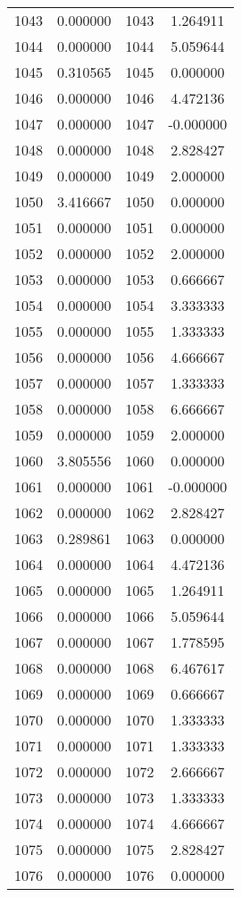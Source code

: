 \documentclass[12pt]{article}
\begin{document}
\begin{longtable}{@{}cccc@{}}
1043 & 0.000000 & 1043 & 1.264911 \\
1044 & 0.000000 & 1044 & 5.059644 \\
1045 & 0.310565 & 1045 & 0.000000 \\
1046 & 0.000000 & 1046 & 4.472136 \\
1047 & 0.000000 & 1047 & -0.000000 \\
1048 & 0.000000 & 1048 & 2.828427 \\
1049 & 0.000000 & 1049 & 2.000000 \\
1050 & 3.416667 & 1050 & 0.000000 \\
1051 & 0.000000 & 1051 & 0.000000 \\
1052 & 0.000000 & 1052 & 2.000000 \\
1053 & 0.000000 & 1053 & 0.666667 \\
1054 & 0.000000 & 1054 & 3.333333 \\
1055 & 0.000000 & 1055 & 1.333333 \\
1056 & 0.000000 & 1056 & 4.666667 \\
1057 & 0.000000 & 1057 & 1.333333 \\
1058 & 0.000000 & 1058 & 6.666667 \\
1059 & 0.000000 & 1059 & 2.000000 \\
1060 & 3.805556 & 1060 & 0.000000 \\
1061 & 0.000000 & 1061 & -0.000000 \\
1062 & 0.000000 & 1062 & 2.828427 \\
1063 & 0.289861 & 1063 & 0.000000 \\
1064 & 0.000000 & 1064 & 4.472136 \\
1065 & 0.000000 & 1065 & 1.264911 \\
1066 & 0.000000 & 1066 & 5.059644 \\
1067 & 0.000000 & 1067 & 1.778595 \\
1068 & 0.000000 & 1068 & 6.467617 \\
1069 & 0.000000 & 1069 & 0.666667 \\
1070 & 0.000000 & 1070 & 1.333333 \\
1071 & 0.000000 & 1071 & 1.333333 \\
1072 & 0.000000 & 1072 & 2.666667 \\
1073 & 0.000000 & 1073 & 1.333333 \\
1074 & 0.000000 & 1074 & 4.666667 \\
1075 & 0.000000 & 1075 & 2.828427 \\
1076 & 0.000000 & 1076 & 0.000000 \\

\end{longtable}
\end{document}
